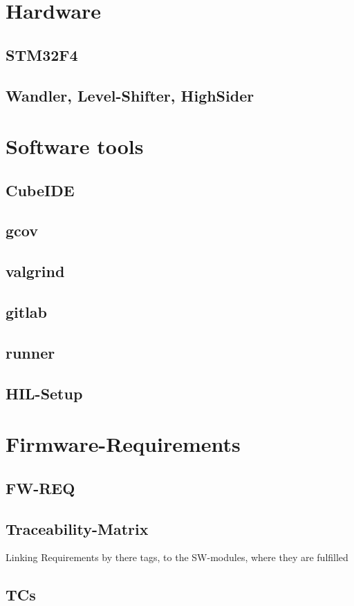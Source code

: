 	\section{Hardware}
		\subsection{STM32F4}
		\subsection{Wandler, Level-Shifter, HighSider}

	\section{Software tools}
		\subsection{CubeIDE}
		\subsection{gcov}
		\subsection{valgrind}
		\subsection{gitlab}
		\subsection{runner}
		\subsection{HIL-Setup}
		
	\section{Firmware-Requirements}
		\subsection{FW-REQ}
		\subsection{Traceability-Matrix}
		Linking Requirements by there tags, to the SW-modules, where they are fulfilled
		\subsection{TCs}
